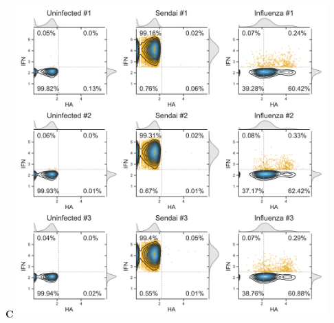 \documentclass[10pt,letterpaper]{article}
\begin{document}
\begin{suppfig}
\begin{minipage}[t]{0.55\textwidth}
{\bf \Large C}
\includegraphics[width=0.9\textwidth, valign=t]{figures/IFN_stochastic/Flow/flow_plot.pdf}

\end{minipage}


\end{suppfig}
\end{document}
